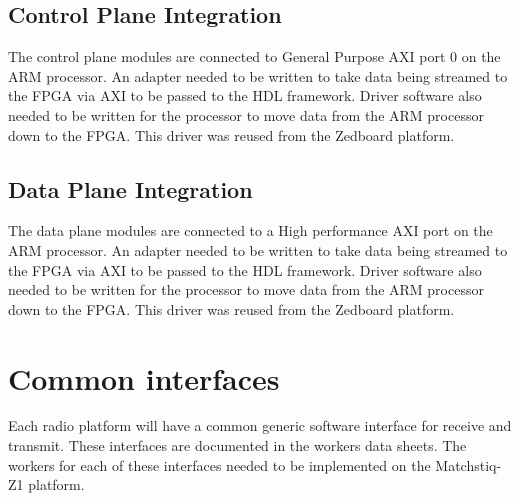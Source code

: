 \documentclass{article}
\begin{document}
  \subsection*{Control Plane Integration}
    The control plane modules are connected to General Purpose AXI port 0 on the ARM processor.  An adapter needed to be written to take data being streamed to the FPGA via AXI to be passed to the HDL framework.  Driver software also needed to be written for the processor to move data from the ARM processor down to the FPGA.  This driver was reused from the Zedboard platform.


  \subsection*{Data Plane Integration}
    The data plane modules are connected to a High performance AXI port on the ARM processor.  An adapter needed to be written to take data being streamed to the FPGA via AXI to be passed to the HDL framework.  Driver software also needed to be written for the processor to move data from the ARM processor down to the FPGA.  This driver was reused from the Zedboard platform.

\section*{Common interfaces}
  Each radio platform will have a common generic software interface for receive and transmit.  These interfaces are documented in the workers data sheets.  The workers for each of these interfaces needed to be implemented on the Matchstiq-Z1 platform.
\end{document}
